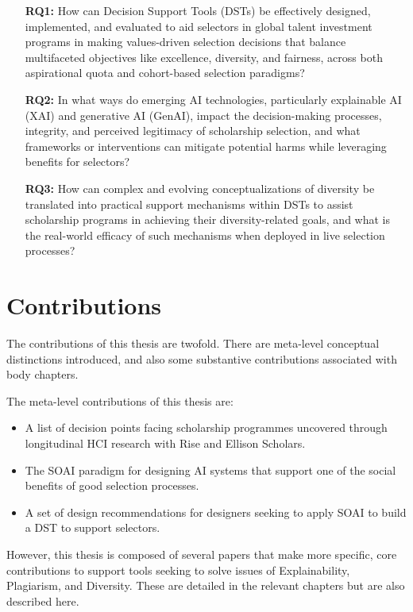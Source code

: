 \begin{enumerate}
    \item[\textbf{RQ1:}] How can Decision Support Tools (DSTs) be effectively designed, implemented, and evaluated to aid selectors in global talent investment programs in making values-driven selection decisions that balance multifaceted objectives like excellence, diversity, and fairness, across both aspirational quota and cohort-based selection paradigms?
    \item[\textbf{RQ2:}] In what ways do emerging AI technologies, particularly explainable AI (XAI) and generative AI (GenAI), impact the decision-making processes, integrity, and perceived legitimacy of scholarship selection, and what frameworks or interventions can mitigate potential harms while leveraging benefits for selectors?
    \item[\textbf{RQ3:}] How can complex and evolving conceptualizations of diversity be translated into practical support mechanisms within DSTs to assist scholarship programs in achieving their diversity-related goals, and what is the real-world efficacy of such mechanisms when deployed in live selection processes?
\end{enumerate}

\section{Contributions} 
The contributions of this thesis are twofold. There are meta-level conceptual distinctions introduced, and also some substantive contributions associated with body chapters.

The meta-level contributions of this thesis are:

\begin{itemize}
    \item A list of decision points facing scholarship programmes uncovered through longitudinal HCI research with Rise and Ellison Scholars.
    \item The SOAI paradigm for designing AI systems that support one of the social benefits of good selection processes.
    \item A set of design recommendations for designers seeking to apply SOAI to build a DST to support selectors.
\end{itemize}

However, this thesis is composed of several papers that make more specific, core contributions to support tools seeking to solve issues of Explainability, Plagiarism, and Diversity. These are detailed in the relevant chapters but are also described here.

